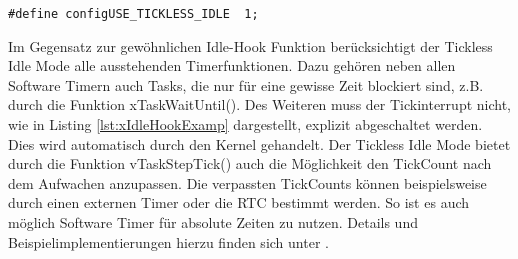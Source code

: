 \begin{lstlisting}[label=lst:defineTicklessIdle, numbers = none]
#define configUSE_TICKLESS_IDLE  1; 
\end{lstlisting}
Im Gegensatz zur gewöhnlichen Idle-Hook Funktion be\-rück\-sich\-tigt der Tickless Idle Mode alle ausstehenden Timerfunktionen. Dazu gehören neben allen Software Timern auch Tasks, die nur für eine gewisse Zeit blockiert sind, z.B. durch die Funktion xTaskWaitUntil(). Des Weiteren muss der Tickinterrupt nicht, wie in Listing \ref{lst:xIdleHookExamp} dargestellt, explizit abgeschaltet werden. Dies wird automatisch durch den Kernel gehandelt. Der Tickless Idle Mode bietet durch die Funktion vTaskStepTick() auch die Möglichkeit den TickCount nach dem Aufwachen anzupassen. Die verpassten TickCounts können beispielsweise durch einen externen Timer oder die RTC bestimmt werden. So ist es auch möglich Software Timer für absolute Zeiten zu nutzen. Details und Beispielimplementierungen hierzu finden sich unter \cite{FreeRtosAdvanced}.  